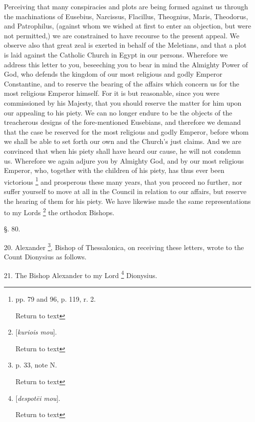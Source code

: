 Perceiving that many conspiracies and plots are
being formed against us through the machinations of Eusebius,
Narcissus, Flacillus, Theognius, Maris, Theodorus, and Patrophilus,
(against whom we wished at first to enter an objection, but were not
permitted,) we are constrained to have recourse to the present appeal.
We observe also that great zeal is exerted in behalf of the Meletians,
and that a plot is laid against the Catholic Church in Egypt in our
persons. Wherefore we address this letter to you, beseeching you to
bear in mind the Almighty Power of God, who defends the kingdom of our
most religious and godly Emperor Constantine, and to reserve the
bearing of the affairs which concern us for the most religious Emperor
himself. For it is but reasonable, since you were commissioned by his
Majesty, that you should reserve the matter for him upon our appealing
to his piety. We can no longer endure to be the objects of the
treacherous designs of the fore-mentioned Eusebians, and therefore we
demand that the case be reserved for the most religious and godly
Emperor, before whom we shall be able to set forth our own and the
Church's just claims. And we are convinced that when his piety shall
have heard our cause, he will not condemn us. Wherefore we again
adjure you by Almighty God, and by our most religious Emperor, who,
together with the children of his piety, has thus ever been victorious
\footnote{pp. 79 and 96, p. 119, r. 2.

Return to text} and prosperous these
many years, that you proceed no further, nor suffer yourself to move
at all in the Council in relation to our affairs, but reserve the
hearing of them for his piety. We have likewise made the same
representations to my Lords \footnote{[\emph{kuriois mou}].

Return to text} the orthodox Bishops.

§. 80.

20. Alexander \footnote{p. 33, note N.

Return to text}, Bishop of Thessalonica, on receiving these letters, wrote to
the Count Dionysius as follows.

21. The Bishop Alexander to my Lord \footnote{[\emph{despot\={e}i mou}].

Return to text} Dionysius.

